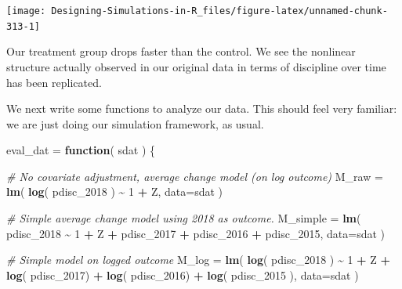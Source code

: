 \documentclass[
]{book}
\newenvironment{Shaded}{\begin{snugshade}}{\end{snugshade}}
\newcommand{\AttributeTok}[1]{\textcolor[rgb]{0.13,0.29,0.53}{#1}}
\newcommand{\CommentTok}[1]{\textcolor[rgb]{0.56,0.35,0.01}{\textit{#1}}}
\newcommand{\ControlFlowTok}[1]{\textcolor[rgb]{0.13,0.29,0.53}{\textbf{#1}}}
\newcommand{\DecValTok}[1]{\textcolor[rgb]{0.00,0.00,0.81}{#1}}
\newcommand{\FunctionTok}[1]{\textcolor[rgb]{0.13,0.29,0.53}{\textbf{#1}}}
\newcommand{\NormalTok}[1]{#1}
\newcommand{\OtherTok}[1]{\textcolor[rgb]{0.56,0.35,0.01}{#1}}
\newcommand{\SpecialCharTok}[1]{\textcolor[rgb]{0.81,0.36,0.00}{\textbf{#1}}}
\begin{document}
\begin{center}\texttt{[image: Designing-Simulations-in-R\_files/figure-latex/unnamed-chunk-313-1]} \end{center}

Our treatment group drops faster than the control. We see the nonlinear structure actually observed in our original data in terms of discipline over time has been replicated.

We next write some functions to analyze our data.
This should feel very familiar: we are just doing our simulation framework, as usual.

\begin{Shaded}
\begin{Highlighting}[]
\NormalTok{eval\_dat }\OtherTok{=} \ControlFlowTok{function}\NormalTok{( sdat ) \{}
    
    \CommentTok{\# No covariate adjustment, average change model (on log outcome)}
\NormalTok{    M\_raw }\OtherTok{=} \FunctionTok{lm}\NormalTok{( }\FunctionTok{log}\NormalTok{( pdisc\_2018 ) }\SpecialCharTok{\textasciitilde{}} \DecValTok{1} \SpecialCharTok{+}\NormalTok{ Z, }\AttributeTok{data=}\NormalTok{sdat )}

    \CommentTok{\# Simple average change model using 2018 as outcome.}
\NormalTok{    M\_simple }\OtherTok{=} \FunctionTok{lm}\NormalTok{( pdisc\_2018 }\SpecialCharTok{\textasciitilde{}} \DecValTok{1} \SpecialCharTok{+}\NormalTok{ Z }\SpecialCharTok{+}\NormalTok{ pdisc\_2017 }\SpecialCharTok{+}\NormalTok{ pdisc\_2016 }\SpecialCharTok{+}\NormalTok{ pdisc\_2015,}
                   \AttributeTok{data=}\NormalTok{sdat )}

    \CommentTok{\# Simple model on logged outcome}
\NormalTok{    M\_log }\OtherTok{=} \FunctionTok{lm}\NormalTok{( }\FunctionTok{log}\NormalTok{( pdisc\_2018 ) }\SpecialCharTok{\textasciitilde{}} \DecValTok{1} \SpecialCharTok{+}\NormalTok{ Z }\SpecialCharTok{+} \FunctionTok{log}\NormalTok{( pdisc\_2017) }\SpecialCharTok{+} 
                  \FunctionTok{log}\NormalTok{( pdisc\_2016) }\SpecialCharTok{+} \FunctionTok{log}\NormalTok{( pdisc\_2015 ),}
                \AttributeTok{data=}\NormalTok{sdat )}
    

\end{Highlighting}
\end{Shaded}
\end{document}
